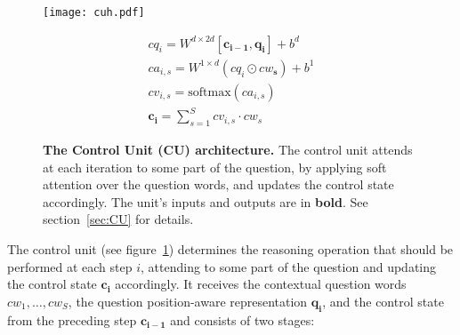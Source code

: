 \documentclass[fleqn]{article}
\newcommand{\figref}[1]{figure~\ref{fig:#1}}
\newcommand{\secref}[1]{section~\ref{sec:#1}}
\begin{document}
\begin{figure}[t]
\centering

\begin{minipage}{0.59\textwidth}
\noindent
\vspace*{-8pt}
\texttt{[image: cuh.pdf]}
\end{minipage}
\hspace*{-35pt}
\begin{minipage}{0.48\textwidth}
\noindent
\footnotesize
\begin{subequations}
\begin{gather}
{\mathit{cq}_i} = {W}^{d\times 2d}\left[\boldsymbol{c_{i-1}},\boldsymbol{q_i}\right] + {b}^d\tag{c1} \\[2pt]
{\mathit{ca}_{i,s}} = W^{1\times d}({\mathit{cq}_i} \odot \boldsymbol{\mathit{cw}_s}) + b^1\tag{c2.1} \\[5pt]
{\mathit{cv}_{i,s}} = \textrm{softmax}({{ca}_{i,s}})\tag{c2.2} \\[-0.5pt]
\boldsymbol{c_{i}} = \sum\limits_{s = 1}^S {\mathit{cv}_{i,s}}  \cdot {\boldsymbol{\mathit{cw}}_s}\tag{c2.3}
\end{gather}
\end{subequations}
\end{minipage}

\caption{\textbf{The Control Unit (CU) architecture.} The control unit attends at each iteration to some part of the question, by applying soft attention over the question words, and updates the control state accordingly. The unit's inputs and outputs are in \textbf{bold}. See \secref{CU} for details.}
\label{fig:control}
\end{figure}

The control unit (see \figref{control}) determines the reasoning operation that should be performed at each step \(i\), attending to some part of the question and updating the control state \(\boldsymbol{c_i}\) accordingly. It receives the contextual question words \({\boldsymbol{\mathit{cw}}_1,\ldots,\boldsymbol{\mathit{cw}}_S}\), the question position-aware representation \(\boldsymbol{q_i}\), and the control state from the preceding step \(\boldsymbol{c_{i-1}}\) and consists of two stages:
\end{document}
